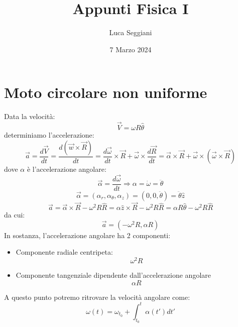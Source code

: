 \documentclass[a4paper,12pt]{article}
\title{Appunti Fisica I}
\author{Luca Seggiani}
\date{7 Marzo 2024}
\begin{document}
\maketitle
\section{Moto circolare non uniforme}
Data la velocità:
$$ \vec{V} = \omega R \hat{\theta} $$
determiniamo l'accelerazione:
$$ \vec{a} = \frac{d\vec{V}}{dt} = \frac{d(\vec{w} \times \vec{R})}{dt} = \frac{d\vec{\omega}}{dt} \times \vec{R}
+ \vec{\omega} \times \frac{d\vec{R}}{dt} = \vec{\alpha} \times \vec{R} + \vec{\omega} \times (\vec{\omega} \times \vec{R}) $$
dove $\alpha$ è l'accelerazione angolare:
$$ \vec{\alpha} = \frac{d\vec{\omega}}{dt} \Rightarrow \alpha = \dot{\omega} = \ddot{\theta} $$
$$ \vec{\alpha} = (\alpha_r, \alpha_{\theta}, \alpha_z) = (0, 0, \ddot{\theta}) = \ddot{\theta}\hat{z} $$
$$ \vec{a} = \vec{\alpha} \times \vec{R} - \omega^2 R \hat{R} = \alpha\hat{z}\times \vec{R} - \omega^2 R \hat{R} = \alpha R \hat{\theta} - \omega^2 R \hat{R} $$
da cui:
$$ \vec{a} = (-\omega^2 R, \alpha R) $$
In sostanza, l'accelerazione angolare ha 2 componenti:
\begin{itemize}
  \item Componente radiale centripeta:
    $$ \omega^2 R$$
  \item Componente tangenziale dipendente dall'accelerazione angolare
    $$ \alpha R $$
\end{itemize}
A questo punto potremo ritrovare la velocità angolare come:
$$ \omega(t) = \omega_{t_0}  + \int_{t_0}^t \alpha(t')dt' $$
\end{document}
